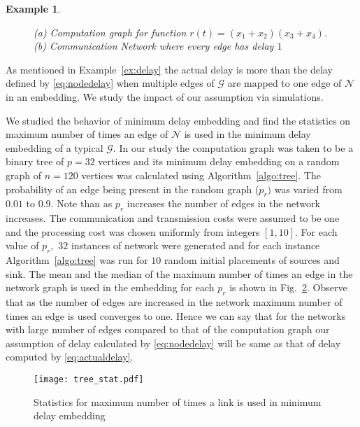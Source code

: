 \documentclass[journal]{IEEEtran}
\newtheorem{example}{{\bf Example}}
\newcommand{\net}{\mathcal{N}}
\newcommand{\compgraph}{\mathcal{G}}
\begin{document}
\begin{example}
\begin{figure}[tbp]
{
} 
  \caption{(a) Computation graph for function $r(t) =
      (x_1+x_2)(x_3+x_4)$.  (b) Communication Network where every
      edge has delay $1$}
    \label{fig:delay}
  \end{figure}
\end{example}

As mentioned in Example~\ref{ex:delay} the actual delay is more than
the delay defined by \eqref{eq:nodedelay} when multiple edges of
$\compgraph$ are mapped to one edge of $\net$ in an embedding. We
study the impact of our assumption via simulations.

We studied the behavior of minimum delay embedding and find the
statistics on maximum number of times an edge of $\net$ is used in the
minimum delay embedding of a typical $\compgraph.$ In our study the
computation graph was taken to be a binary tree of $p=32$ vertices and
its minimum delay embedding on a random graph of $n=120$ vertices was
calculated using Algorithm~\ref{algo:tree}. The probability of an edge
being present in the random graph ($p_r)$ was varied from $0.01$ to
$0.9.$ Note than as $p_r$ increases the number of edges in the network
increases. The communication and transmission costs were assumed to be
one and the processing cost was chosen uniformly from integers
$[1,10].$ For each value of $p_r,$ $32$ instances of network were
generated and for each instance Algorithm~\ref{algo:tree} was run for
$10$ random initial placements of sources and sink. The mean and the
median of the maximum number of times an edge in the network graph is
used in the embedding for each $p_r$ is shown in
Fig.~\ref{fig:meantree}. Observe that as the number of edges are
increased in the network maximum number of times an edge is used
converges to one. Hence we can say that for the networks with large
number of edges compared to that of the computation graph our
assumption of delay calculated by \eqref{eq:nodedelay} will be same as
that of delay computed by \eqref{eq:actualdelay}.

\begin{figure}[tbp]
  \centering
  \texttt{[image: tree\_stat.pdf]}
  \caption{Statistics for maximum number of times a link is used in
    minimum delay embedding}
  \label{fig:meantree}
\end{figure}
\end{document}
